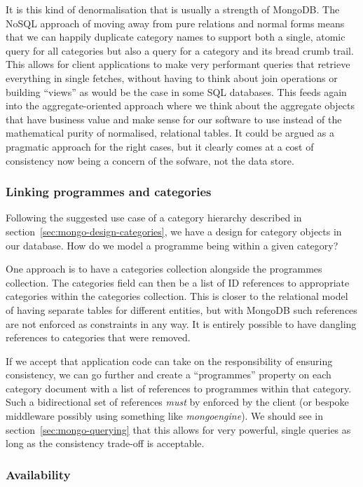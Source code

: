 \documentclass[11pt,a4paper]{article}
\begin{document}
It is this kind of denormalisation that is usually a strength of MongoDB.
The NoSQL approach of moving away from pure relations and normal forms
means that we can happily duplicate category names to support
both a single, atomic query for all categories but also a query
for a category and its bread crumb trail. This allows for client
applications to make very performant queries that retrieve everything
in single fetches, without having to think about join operations
or building ``views'' as would be the case in some SQL databases. This
feeds again into the aggregate-oriented approach where we think about
the aggregate objects that have business value and make sense for our
software to use instead of the mathematical purity of normalised,
relational tables. It could be argued as a pragmatic approach for
the right cases, but it clearly comes at a cost of consistency now
being a concern of the sofware, not the data store.

\subsubsection{Linking programmes and categories}

Following the suggested use case of a category hierarchy described
in section~\ref{sec:mongo-design-categories}, we have a design for
category objects in our database. How do we model a programme
being within a given category?

One approach is to have a categories collection alongside the
programmes collection. The categories field can then be a list
of ID references to appropriate categories within the categories
collection. This is closer to the relational model of having
separate tables for different entities, but with MongoDB such
references are not enforced as constraints in any way. It is
entirely possible to have dangling references to categories
that were removed.

If we accept that application code can take on the responsibility
of ensuring consistency, we can go further and create a
``programmes'' property on each category document with a list
of references to programmes within that category. Such a bidirectional
set of references \emph{must} by enforced by the client (or bespoke
middleware possibly using something like \emph{mongoengine}). We
should see in section~\ref{sec:mongo-querying} that this allows for
very powerful, single queries as long as the consistency trade-off
is acceptable.

\subsubsection{Availability}
\end{document}
